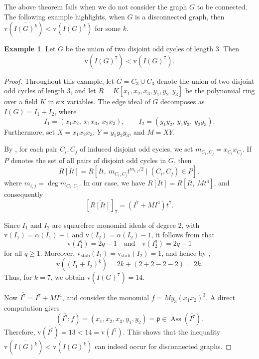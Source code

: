 \documentclass[11pt,reqno,a4paper]{amsart}
\theoremstyle{definition}
\newtheorem{example}[theorem]{Example}
\begin{document}
\noindent The above theorem fails when we do not consider the graph \(G\) to be connected. The following example highlights, when \(G\) is a disconnected graph, then
\(
\mathrm{v}(\overline{I(G)^k}) < \mathrm{v}(I(G)^k)
\)
for some \(k\).


\begin{example}
Let \(G\) be the union of two disjoint odd cycles of length \(3\). Then
\[
\mathrm{v}(\overline{I(G)^7}) < \mathrm{v}(I(G)^7).
\]
\end{example}



\begin{proof}
    


Throughout this example, let \(G = C_3 \cup C_3\) denote the union of two disjoint odd cycles of length \(3\), and let \(R = K[x_1,x_2,x_3,y_1,y_2,y_3]\) be the polynomial ring over a field \(K\) in six variables. The edge ideal of \(G\) decomposes as \(I(G) = I_1 + I_2\), where
\[
I_1 = (x_1x_2,\ x_1x_3,\ x_2x_3), \qquad
I_2 = (y_1y_2,\ y_1y_3,\ y_2y_3).
\]
Furthermore, set \(X = x_1x_2x_3\), \(Y = y_1y_2y_3\), and \(M = XY\).

\noindent By \cite[Theorem 10.5.12]{Vil26}, for each pair \(C_i, C_j\) of induced disjoint odd cycles, we set \(m_{C_i,C_j} = x_{C_i}x_{C_j}\). If \(P\) denotes the set of all pairs of disjoint odd cycles in \(G\), then
\[
\overline{R[It]} = R[It,\ m_{C_i,C_j}t^{m_{i,j}/2} \mid (C_i,C_j) \in P],
\]
where \(m_{i,j} = \deg m_{C_i,C_j}\). In our case, we have \(\overline{R[It]} = R[It,\ Mt^3]\), and consequently
\[
[\overline{R[It]}]_7 = (I^7 + MI^4)t^7.
\]

\noindent Since \(I_1\) and \(I_2\) are squarefree monomial ideals of degree \(2\), with \(\mathrm{v}(I_1) = \alpha(I_1) - 1\) and \(\mathrm{v}(I_2) = \alpha(I_2) - 1\), it follows from \cite[Corollary 4.2]{BiswasMandalSaha26} that
\[
\mathrm{v}(I_1^q) = 2q - 1 \quad\text{and}\quad \mathrm{v}(I_2^q) = 2q - 1
\]
for all \(q \ge 1\). Moreover, \(\mathrm{v}_{\mathrm{stab}}(I_1) = \mathrm{v}_{\mathrm{stab}}(I_2) = 1\), and hence  by \cite[Theorem 5.2]{FicarraMarques25}, 
\[
\mathrm{v}((I_1 + I_2)^k) = 2k + (2 + 2 - 2 - 2) = 2k.
\]
Thus, for \(k = 7\), we obtain \(\mathrm{v}(I(G)^7) = 14\).

\noindent Now  \( \overline{I^7} = I^7 + MI^4\), and consider the monomial \(f = M y_3 (x_1x_2)^3\). A direct computation gives
\[
(\overline{I^7} : f) = (x_1, x_2, x_3, y_1, y_2) = \mathfrak{p} \in \operatorname{Ass}(\overline{I^7}).
\]
Therefore, \(\mathrm{v}(\overline{I^7}) = 13 < 14 = \mathrm{v}(I^7)\). This shows that the inequality \(\mathrm{v}(\overline{I(G)^k}) < \mathrm{v}(I(G)^k)\) can indeed occur for disconnected graphs.


\end{proof}
\end{document}
